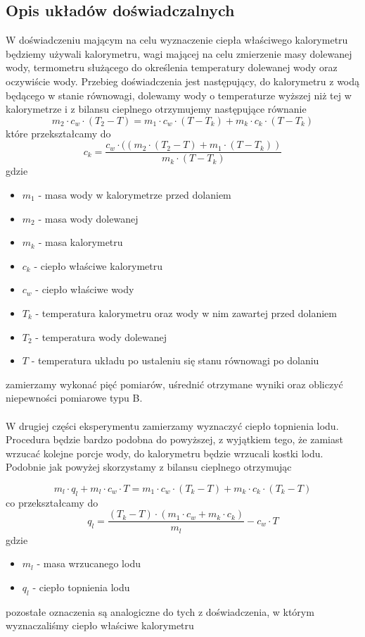 \documentclass{article}
\begin{document}
\subsection{Opis układów doświadczalnych}
W doświadczeniu mającym na celu wyznaczenie ciepła właściwego kalorymetru będziemy używali kalorymetru, wagi mającej na celu zmierzenie masy dolewanej wody, termometru służącego do określenia temperatury dolewanej wody oraz oczywiście wody. Przebieg doświadczenia jest następujący, do kalorymetru z wodą będącego w stanie równowagi, dolewamy wody o temperaturze wyższej niż tej w kalorymetrze i z bilansu cieplnego otrzymujemy następujące równanie
\begin{equation}
    m_{2}\cdot c_{w}\cdot (T_{2}-T)=m_{1}\cdot c_{w}\cdot (T-T_{k})+m_{k}\cdot c_{k}\cdot (T-T_{k})
\end{equation}
które przekształcamy do
\begin{equation}
        c_{k}=\frac{c_{w}\cdot((m_{2}\cdot (T_{2}-T)+m_{1}\cdot (T-T_{k}))}{m_{k}\cdot (T-T_{k})}
\end{equation}
gdzie
\begin{itemize}
\item$m_{1}$ - masa wody w kalorymetrze przed dolaniem
\item$m_{2}$ - masa wody dolewanej
\item$m_{k}$ - masa kalorymetru
\item$c_{k}$ - ciepło właściwe kalorymetru
\item$c_{w}$ - ciepło właściwe wody
\item$T_{k}$ - temperatura kalorymetru oraz wody w nim zawartej przed dolaniem
\item$T_{2}$ - temperatura wody dolewanej
\item$T$ - temperatura układu po ustaleniu się stanu równowagi po dolaniu
\end{itemize}
zamierzamy wykonać pięć pomiarów, uśrednić otrzymane wyniki oraz obliczyć niepewności pomiarowe typu B.\\\\
W drugiej części eksperymentu zamierzamy wyznaczyć ciepło topnienia lodu. Procedura będzie bardzo podobna do powyższej, z wyjątkiem tego, że zamiast wrzucać kolejne porcje wody, do kalorymetru będzie wrzucali kostki lodu. Podobnie jak powyżej skorzystamy z bilansu cieplnego otrzymując

\begin{equation}
     m_l\cdot q_l+m_l\cdot c_{w}\cdot T=m_{1}\cdot c_{w}\cdot (T_{k}-T)+m_{k}\cdot c_{k}\cdot (T_{k}-T)
\end{equation}
co przekształcamy do 
\begin{equation}
    q_l=\frac{ (T_{k}-T)\cdot (m_{1}\cdot c_{w}+m_{k}\cdot c_{k})}{m_l}-c_w\cdot T
\end{equation}
gdzie 
\begin{itemize}
\item$m_{l}$ - masa wrzucanego lodu
\item$q_l$ - ciepło topnienia lodu 
\end{itemize}
pozostałe oznaczenia są analogiczne do tych z doświadczenia, w którym wyznaczaliśmy ciepło właściwe kalorymetru
\end{document}
